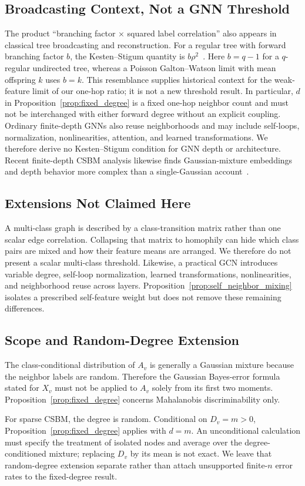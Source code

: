 \subsection{Broadcasting Context, Not a GNN Threshold}

The product ``branching factor $\times$ squared label correlation'' also appears in classical tree broadcasting and reconstruction. For a regular tree with forward branching factor $b$, the Kesten--Stigum quantity is $b\rho^2$~\cite{kesten1966additional,mossel2015reconstruction}. Here $b=q-1$ for a $q$-regular undirected tree, whereas a Poisson Galton--Watson limit with mean offspring $k$ uses $b=k$. This resemblance supplies historical context for the weak-feature limit of our one-hop ratio; it is not a new threshold result. In particular, $d$ in Proposition~\ref{prop:fixed_degree} is a fixed one-hop neighbor count and must not be interchanged with either forward degree without an explicit coupling. Ordinary finite-depth GNNs also reuse neighborhoods and may include self-loops, normalization, nonlinearities, attention, and learned transformations. We therefore derive no Kesten--Stigum condition for GNN depth or architecture. Recent finite-depth CSBM analysis likewise finds Gaussian-mixture embeddings and depth behavior more complex than a single-Gaussian account~\cite{pmlr-v269-dalle25a}.

\subsection{Extensions Not Claimed Here}

A multi-class graph is described by a class-transition matrix rather than one scalar edge correlation. Collapsing that matrix to homophily can hide which class pairs are mixed and how their feature means are arranged. We therefore do not present a scalar multi-class threshold. Likewise, a practical GCN introduces variable degree, self-loop normalization, learned transformations, nonlinearities, and neighborhood reuse across layers. Proposition~\ref{prop:self_neighbor_mixing} isolates a prescribed self-feature weight but does not remove these remaining differences.

\subsection{Scope and Random-Degree Extension}

The class-conditional distribution of $A_v$ is generally a Gaussian mixture because the neighbor labels are random. Therefore the Gaussian Bayes-error formula stated for $X_v$ must not be applied to $A_v$ solely from its first two moments. Proposition~\ref{prop:fixed_degree} concerns Mahalanobis discriminability only.

For sparse CSBM, the degree is random. Conditional on $D_v=m>0$, Proposition~\ref{prop:fixed_degree} applies with $d=m$. An unconditional calculation must specify the treatment of isolated nodes and average over the degree-conditioned mixture; replacing $D_v$ by its mean is not exact. We leave that random-degree extension separate rather than attach unsupported finite-$n$ error rates to the fixed-degree result.
